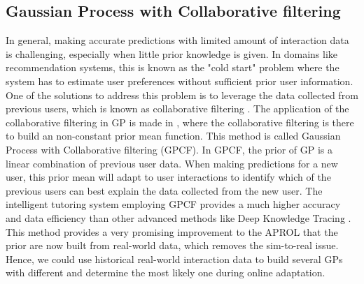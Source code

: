 \subsection{Gaussian Process with Collaborative filtering}
In general, making accurate predictions with limited amount of interaction data is challenging, especially when little prior knowledge is given.
In domains like recommendation systems, this is known as the "cold start" problem where the system has to estimate user preferences without sufficient prior user information.
One of the solutions to address this problem is to leverage the data collected from previous users, which is known as collaborative filtering \cite{CF_recom}. 
The application of the collaborative filtering in GP is made in \cite{GPCF}, where the collaborative filtering is there to build an non-constant prior mean function.
This method is called Gaussian Process with Collaborative filtering (GPCF).
In GPCF, the prior of GP is a linear combination of previous user data. 
When making predictions for a new user, this prior mean will adapt to user interactions to identify which of the previous users can best explain the data collected from the new user. 
The intelligent tutoring system employing GPCF provides a much higher accuracy and data efficiency than other advanced methods like Deep Knowledge Tracing \cite{DKT}. 
This method provides a very promising improvement to the APROL that the prior are now built from real-world data, which removes the sim-to-real issue.
Hence, we could use historical real-world interaction data to build several GPs with different and determine the most likely one during online adaptation.